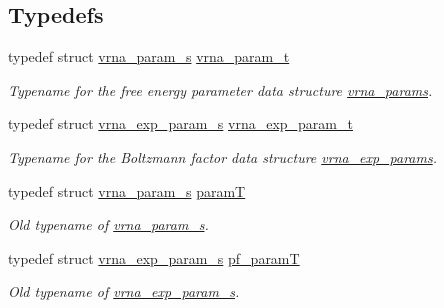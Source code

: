 \subsection*{Typedefs}
\begin{DoxyCompactItemize}
\item 
typedef struct \mbox{\hyperlink{group__energy__parameters_structvrna__param__s}{vrna\+\_\+param\+\_\+s}} \mbox{\hyperlink{group__energy__parameters_ga8a69ca7d787e4fd6079914f5343a1f35}{vrna\+\_\+param\+\_\+t}}
\begin{DoxyCompactList}\small\item\em Typename for the free energy parameter data structure \mbox{\hyperlink{group__energy__parameters_gad0e3e7e74bdc50d1709d40c92993185e}{vrna\+\_\+params}}. \end{DoxyCompactList}\item 
typedef struct \mbox{\hyperlink{group__energy__parameters_structvrna__exp__param__s}{vrna\+\_\+exp\+\_\+param\+\_\+s}} \mbox{\hyperlink{group__energy__parameters_ga01d8b92fe734df8d79a6169482c7d8d8}{vrna\+\_\+exp\+\_\+param\+\_\+t}}
\begin{DoxyCompactList}\small\item\em Typename for the Boltzmann factor data structure \mbox{\hyperlink{group__energy__parameters_gab1f3016f96aa96bff020cdd904605afa}{vrna\+\_\+exp\+\_\+params}}. \end{DoxyCompactList}\item 
typedef struct \mbox{\hyperlink{group__energy__parameters_structvrna__param__s}{vrna\+\_\+param\+\_\+s}} \mbox{\hyperlink{group__energy__parameters_ga857dde86357d306cc902f0d8b2797659}{paramT}}
\begin{DoxyCompactList}\small\item\em Old typename of \mbox{\hyperlink{group__energy__parameters_structvrna__param__s}{vrna\+\_\+param\+\_\+s}}. \end{DoxyCompactList}\item 
typedef struct \mbox{\hyperlink{group__energy__parameters_structvrna__exp__param__s}{vrna\+\_\+exp\+\_\+param\+\_\+s}} \mbox{\hyperlink{group__energy__parameters_ga8bffe1828e2cbec101769f5cc0b1535b}{pf\+\_\+paramT}}
\begin{DoxyCompactList}\small\item\em Old typename of \mbox{\hyperlink{group__energy__parameters_structvrna__exp__param__s}{vrna\+\_\+exp\+\_\+param\+\_\+s}}. \end{DoxyCompactList}\end{DoxyCompactItemize}
